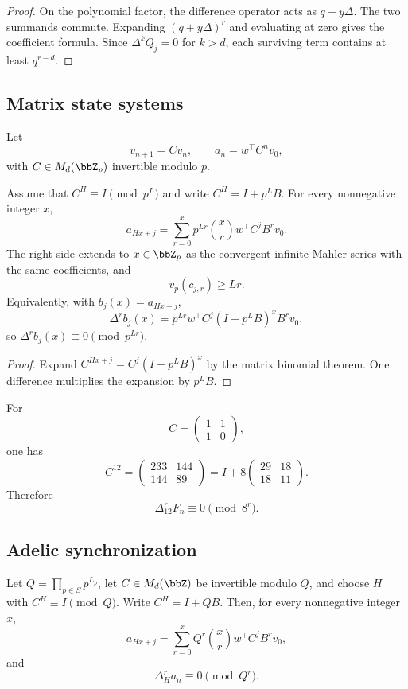 \begin{proof}
On the polynomial factor, the difference operator acts as $q+y\Delta$. The two summands commute. Expanding $(q+y\Delta)^r$ and evaluating at zero gives the coefficient formula. Since $\Delta^kQ_j=0$ for $k>d$, each surviving term contains at least $q^{r-d}$.
\end{proof}

\subsection{Matrix state systems}
Let
\[
 v_{n+1}=Cv_n,\qquad a_n=w^\top C^nv_0,
\]
with $C\in M_d(\bbZ_p)$ invertible modulo $p$.

\begin{theorem}
Assume that $C^H\equiv I\pmod{p^L}$ and write $C^H=I+p^LB$. For every nonnegative integer $x$,
\[
 \boxed{a_{Hx+j}=\sum_{r=0}^{x}p^{Lr}\binom xr w^\top C^jB^rv_0.}
\]
The right side extends to $x\in\bbZ_p$ as the convergent infinite Mahler series with the same coefficients, and
\[
 \boxed{v_p(c_{j,r})\geq Lr.}
\]
Equivalently, with $b_j(x)=a_{Hx+j}$,
\[
 \boxed{\Delta^rb_j(x)=p^{Lr}w^\top C^j(I+p^LB)^xB^rv_0,}
\]
so $\Delta^rb_j(x)\equiv0\pmod{p^{Lr}}$.
\end{theorem}

\begin{proof}
Expand $C^{Hx+j}=C^j(I+p^LB)^x$ by the matrix binomial theorem. One difference multiplies the expansion by $p^LB$.
\end{proof}

\begin{example}
For
\[
 C=\begin{pmatrix}1&1\\1&0\end{pmatrix},
\]
one has
\[
 C^{12}=\begin{pmatrix}233&144\\144&89\end{pmatrix}
 =I+8\begin{pmatrix}29&18\\18&11\end{pmatrix}.
\]
Therefore
\[
 \boxed{\Delta_{12}^rF_n\equiv0\pmod{8^r}.}
\]
\end{example}

\subsection{Adelic synchronization}
\begin{theorem}
Let $Q=\prod_{p\in S}p^{L_p}$, let $C\in M_d(\bbZ)$ be invertible modulo $Q$, and choose $H$ with $C^H\equiv I\pmod Q$. Write $C^H=I+QB$. Then, for every nonnegative integer $x$,
\[
 \boxed{a_{Hx+j}=\sum_{r=0}^{x}Q^r\binom xr w^\top C^jB^rv_0,}
\]
and
\[
 \boxed{\Delta_H^ra_n\equiv0\pmod{Q^r}.}
\]
\end{theorem}

